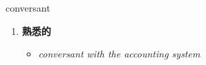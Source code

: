 
\begin{frame}
{\huge conversant}
\begin{center}
\begin{enumerate}\Large
  \item \textbf{熟悉的}
  \begin{itemize}
    \item \em{\Large{conversant with the accounting system}}
  \end{itemize}
\end{enumerate}
\end{center}
\end{frame}
